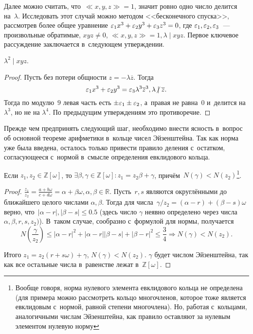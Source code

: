 \documentclass{article}
\begin{document}
Далее можно считать, что~$\ll\!x, y, z\!\gg = 1$, значит ровно одно число
делится на~$\lambda$. Исследовать этот случай можно методом <<бесконечного
спуска>>, рассмотрев более общее уравнение $\varepsilon_1 x^3 + \varepsilon_2 y^3 +
\varepsilon_3 z^3 = 0$, где $\varepsilon_1, \varepsilon_2, \varepsilon_3$~--- произвольные обратимые,
$xyz \ne 0$, $\ll\!x, y, z\!\gg = 1, \lambda \mid xyz$. Первое ключевое
рассуждение заключается в~следующем утверждении.

\begin{claim}
  $\lambda^2 \mid xyz$.
\end{claim}
\begin{proof}
  Пусть без потери общности $z = -\lambda \overline{z}$. Тогда
  $$ \eps_1 x^3 + \eps_2 y^3 = \eps_3 \lambda^3 \overline{z}^3,
  \lambda \ndiv \overline{z}.$$
  Тогда по модулю~$9$ левая часть есть $\pm \varepsilon_1 \pm \varepsilon_2$, а~правая не
  равна~$0$ и~делится на $\lambda^3$, но не на $\lambda^4$. По предыдущим
  утверждениям это противоречие.
\end{proof}

Прежде чем предпринять следующий шаг, необходимо внести ясность в~вопрос об
основной теореме арифметики в~кольце чисел Эйзенштейна. Так как норма уже была
введена, осталось только привести правило деления с~остатком, согласующееся
с~нормой в~смысле определения евклидового кольца.

\begin{claim}
  Если $z_1, z_2 \in \mathbb{Z}[\omega]$, то $\exists \beta, \gamma \in
  \mathbb{Z}[\omega]\colon z_1 = z_2 \beta + \gamma$,
  причём~$N(\gamma) < N(z_2)$\footnote{Вообще говоря, норма нулевого элемента
  евклидового кольца не определена (для примера можно рассмотреть кольцо
  многочленов, которое тоже является евклидовым с~нормой, равной степени
  многочлена). Но, работая с~кольцами, аналогичными числам Эйзенштейна, как
  правило оставляют за нулевым элементом нулевую норму}.
\end{claim}
\begin{proof}
  $\frac{z_1}{z_2} = \frac{a + b\omega}{c + d\omega} = \alpha + \beta \omega,
  \alpha, \beta \in \mathbb{R}$.
  Пусть~$r, s$ являются округлёнными до ближайшего целого числами $\alpha,
  \beta$. Тогда для числа~$\gamma / z_2 = (\alpha - r) + (\beta - s) \omega$
  верно, что~$|\alpha - r|,|\beta - s| \le 0.5$ (здесь число $\gamma$ неявно
  определено через числа $\alpha, \beta, r, s, z_2)$). В~таком случае, сообразно
  с~формулой для нормы, получается
  $$N(\frac{\gamma}{z_2}) \le |\alpha - r|^2 + |\alpha - r||\beta - s| +
  |\beta - r|^2 \le \frac{3}{4} \Rightarrow N(\gamma) < N(z_2).$$

  Итого $z_1 = z_2 (r + s \omega) + \gamma$, $N(\gamma) < N(z_2)$. $\gamma$
  будет числом Эйзенштейна, так как все остальные числа в~равенстве лежат
  в~$\mathbb{Z}[\omega]$.
\end{proof}
\end{document}
